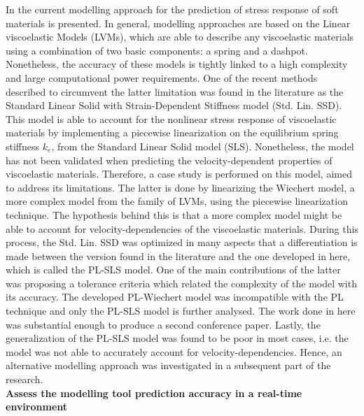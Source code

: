 In  the current modelling approach for the prediction of stress response of soft materials is presented. In general, modelling approaches are based on the Linear viscoelastic Models (LVMs), which are able to describe any viscoelastic materials using a combination of two basic components: a spring and a dashpot. Nonetheless, the accuracy of these models is tightly linked to a high complexity and large computational power requirements. One of the recent methods described to circumvent the latter limitation was found in the literature as the Standard Linear Solid with Strain-Dependent Stiffness model (Std. Lin. SSD). This model is able to account for the nonlinear stress response of viscoelastic materials by implementing a piecewise linearization on the equilibrium spring stiffness $k_e$, from the Standard Linear Solid model (SLS). Nonetheless, the model has not been validated when predicting the velocity-dependent properties of viscoelastic materials. Therefore, a case study is performed on this model, aimed to address its limitations. The latter is done by linearizing the Wiechert model, a more complex model from the family of LVMs, using the piecewise linearization technique. The hypothesis behind this is that a more complex model might be able to account for velocity-dependencies of the viscoelastic materials. During this process, the Std. Lin. SSD was optimized in many aspects that a differentiation is made between the version found in the literature and the one developed in here, which is called the PL-SLS model. One of the main contributions of the latter was proposing a tolerance criteria which related the complexity of the model with its accuracy. The developed PL-Wiechert model was incompatible with the PL technique and only the PL-SLS model is further analysed. The work done in here was substantial enough to produce a second conference paper. Lastly, the generalization of the PL-SLS model was found to be poor in most cases, i.e. the model was not able to accurately account for velocity-dependencies. Hence, an alternative modelling approach was investigated in a subsequent part of the research.
\\[1em]
\noindent \textbf{\large{ Assess the modelling tool prediction accuracy in a real-time environment}}


